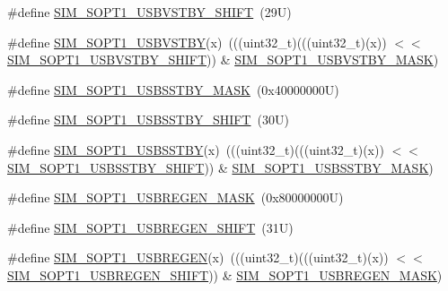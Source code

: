 \begin{DoxyCompactItemize}
\#define \mbox{\hyperlink{group___s_i_m___register___masks_gae945165e21faf14e58288bce0918482a}{S\+I\+M\+\_\+\+S\+O\+P\+T1\+\_\+\+U\+S\+B\+V\+S\+T\+B\+Y\+\_\+\+S\+H\+I\+FT}}~(29\+U)
\item 
\#define \mbox{\hyperlink{group___s_i_m___register___masks_ga3e1f9ad0a4fe10e7c1ae074ca63a674e}{S\+I\+M\+\_\+\+S\+O\+P\+T1\+\_\+\+U\+S\+B\+V\+S\+T\+BY}}(x)~(((uint32\+\_\+t)(((uint32\+\_\+t)(x)) $<$$<$ \mbox{\hyperlink{group___s_i_m___register___masks_gae945165e21faf14e58288bce0918482a}{S\+I\+M\+\_\+\+S\+O\+P\+T1\+\_\+\+U\+S\+B\+V\+S\+T\+B\+Y\+\_\+\+S\+H\+I\+FT}})) \& \mbox{\hyperlink{group___s_i_m___register___masks_gaaf0b406e4bd1800083f48727a7cde829}{S\+I\+M\+\_\+\+S\+O\+P\+T1\+\_\+\+U\+S\+B\+V\+S\+T\+B\+Y\+\_\+\+M\+A\+SK}})
\item 
\#define \mbox{\hyperlink{group___s_i_m___register___masks_ga93a808f7a1d75e26bc3ed565ab257617}{S\+I\+M\+\_\+\+S\+O\+P\+T1\+\_\+\+U\+S\+B\+S\+S\+T\+B\+Y\+\_\+\+M\+A\+SK}}~(0x40000000\+U)
\item 
\#define \mbox{\hyperlink{group___s_i_m___register___masks_ga8a24334d1be5bd01017bd364dd53f268}{S\+I\+M\+\_\+\+S\+O\+P\+T1\+\_\+\+U\+S\+B\+S\+S\+T\+B\+Y\+\_\+\+S\+H\+I\+FT}}~(30\+U)
\item 
\#define \mbox{\hyperlink{group___s_i_m___register___masks_ga06d22c15bc1d9c7845af3457543f6607}{S\+I\+M\+\_\+\+S\+O\+P\+T1\+\_\+\+U\+S\+B\+S\+S\+T\+BY}}(x)~(((uint32\+\_\+t)(((uint32\+\_\+t)(x)) $<$$<$ \mbox{\hyperlink{group___s_i_m___register___masks_ga8a24334d1be5bd01017bd364dd53f268}{S\+I\+M\+\_\+\+S\+O\+P\+T1\+\_\+\+U\+S\+B\+S\+S\+T\+B\+Y\+\_\+\+S\+H\+I\+FT}})) \& \mbox{\hyperlink{group___s_i_m___register___masks_ga93a808f7a1d75e26bc3ed565ab257617}{S\+I\+M\+\_\+\+S\+O\+P\+T1\+\_\+\+U\+S\+B\+S\+S\+T\+B\+Y\+\_\+\+M\+A\+SK}})
\item 
\#define \mbox{\hyperlink{group___s_i_m___register___masks_gac60c367119b3dcc752c4cf857b8a59b5}{S\+I\+M\+\_\+\+S\+O\+P\+T1\+\_\+\+U\+S\+B\+R\+E\+G\+E\+N\+\_\+\+M\+A\+SK}}~(0x80000000\+U)
\item 
\#define \mbox{\hyperlink{group___s_i_m___register___masks_ga99e46c34c02e39338c9b80775bad09db}{S\+I\+M\+\_\+\+S\+O\+P\+T1\+\_\+\+U\+S\+B\+R\+E\+G\+E\+N\+\_\+\+S\+H\+I\+FT}}~(31\+U)
\item 
\#define \mbox{\hyperlink{group___s_i_m___register___masks_ga186d507e27612305db92407d2986a194}{S\+I\+M\+\_\+\+S\+O\+P\+T1\+\_\+\+U\+S\+B\+R\+E\+G\+EN}}(x)~(((uint32\+\_\+t)(((uint32\+\_\+t)(x)) $<$$<$ \mbox{\hyperlink{group___s_i_m___register___masks_ga99e46c34c02e39338c9b80775bad09db}{S\+I\+M\+\_\+\+S\+O\+P\+T1\+\_\+\+U\+S\+B\+R\+E\+G\+E\+N\+\_\+\+S\+H\+I\+FT}})) \& \mbox{\hyperlink{group___s_i_m___register___masks_gac60c367119b3dcc752c4cf857b8a59b5}{S\+I\+M\+\_\+\+S\+O\+P\+T1\+\_\+\+U\+S\+B\+R\+E\+G\+E\+N\+\_\+\+M\+A\+SK}})
\end{DoxyCompactItemize}
